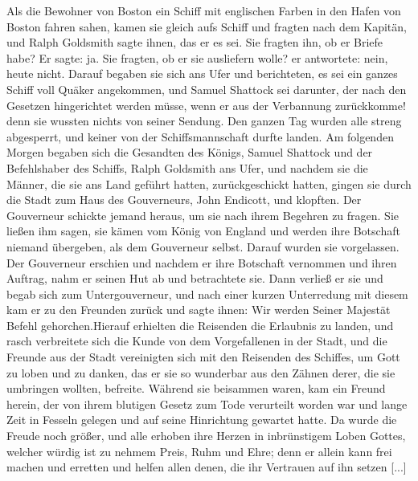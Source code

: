 Als die Bewohner von Boston ein Schiff mit englischen
Farben in den Hafen von Boston fahren sahen, kamen sie
gleich aufs Schiff und fragten nach dem Kapitän, und Ralph
Goldsmith sagte ihnen, das er es sei. Sie fragten ihn, ob er
Briefe habe? Er sagte: \glqq ja\grqq. Sie fragten, ob er sie 
ausliefern wolle? er antwortete: \glqq nein, heute nicht.\grqq 
Darauf begaben sie sich ans Ufer und berichteten, es sei 
ein ganzes Schiff voll Quäker angekommen, und Samuel Shattock 
sei darunter, der nach den Gesetzen hingerichtet werden müsse, 
wenn er aus der Verbannung zurückkomme! denn sie wussten nichts 
von seiner Sendung. Den ganzen Tag wurden alle streng abgesperrt, 
und keiner von der Schiffsmannschaft durfte landen. Am 
folgenden Morgen begaben sich die Gesandten des Königs, 
Samuel Shattock und der Befehlshaber des Schiffs, Ralph 
Goldsmith ans Ufer, und nachdem sie die Männer, die sie ans 
Land geführt hatten, zurückgeschickt hatten,
gingen sie durch die Stadt zum Haus des Gouverneurs, John
Endicott, und klopften. Der Gouverneur schickte jemand heraus,
um sie nach ihrem Begehren zu fragen. Sie ließen ihm sagen,
sie kämen vom König von England und werden ihre Botschaft
niemand übergeben, als dem Gouverneur selbst. Darauf wurden
sie vorgelassen. Der Gouverneur erschien und nachdem er ihre
Botschaft vernommen und ihren Auftrag, nahm er seinen Hut ab
und betrachtete sie. Dann verließ er sie und begab sich zum
Untergouverneur, und nach einer kurzen Unterredung mit diesem
kam er zu den Freunden zurück und sagte ihnen: \glqq Wir
werden Seiner Majestät Befehl gehorchen.\grqq Hierauf erhielten
die Reisenden die Erlaubnis zu landen, und rasch verbreitete sich
die Kunde von dem Vorgefallenen in der Stadt, und die Freunde
aus der Stadt vereinigten sich mit den Reisenden des Schiffes,
um Gott zu loben und zu danken, das er sie so wunderbar aus
den Zähnen derer, die sie umbringen wollten, befreite. Während
sie beisammen waren, kam ein Freund herein, der von ihrem
blutigen Gesetz zum Tode verurteilt worden war und lange Zeit
in Fesseln gelegen und auf seine Hinrichtung gewartet hatte. Da
wurde die Freude noch größer, und alle erhoben ihre Herzen in
inbrünstigem Loben Gottes, welcher würdig ist zu nehmem Preis,
Ruhm und Ehre; denn er allein kann frei machen und erretten
und helfen allen denen, die ihr Vertrauen auf ihn setzen [...]

